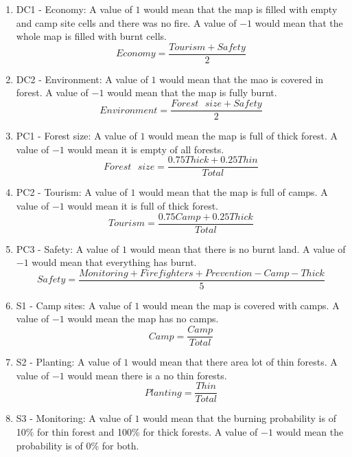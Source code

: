 \begin{enumerate}
\item DC1 - Economy: A value of $1$ would mean that the map is filled with empty and camp site cells and there was no fire. A value of $-1$ would mean that the whole map is filled with burnt cells.
	\begin{equation}
	Economy = \frac{Tourism + Safety}{2}
	\end{equation}
\item DC2 - Environment: A value of $1$ would mean that the mao is covered in forest. A value of $-1$ would mean that the map is fully burnt.
	\begin{equation}
	Environment = \frac{Forest \text{ } size + Safety}{2}
	\end{equation}
\item PC1 - Forest size: A value of $1$ would mean the map is full of thick forest. A value of $-1$ would mean it is empty of all forests.
	\begin{equation}
	Forest \text{ } size = \frac{0.75 Thick + 0.25 Thin}{Total}
	\end{equation}
\item PC2 - Tourism: A value of $1$ would mean that the map is full of camps. A value of $-1$ would mean it is full of thick forest.
	\begin{equation}
	Tourism = \frac{0.75 Camp + 0.25 Thick}{Total}
	\end{equation}
\item PC3 - Safety: A value of $1$ would mean that there is no burnt land. A value of $-1$ would mean that everything has burnt.
	\begin{equation}
	Safety = \frac{Monitoring + Firefighters + Prevention - Camp - Thick}{5}
	\end{equation}
\item S1 - Camp sites: A value of $1$ would mean the map is covered with camps. A value of $-1$ would mean the map has no camps.
	\begin{equation}
	Camp = \frac{Camp}{Total}
	\end{equation}
\item S2 - Planting: A value of $1$ would mean that there area lot of thin forests. A value of $-1$ would mean there is a no thin forests.
	\begin{equation}
	Planting = \frac{Thin}{Total}
	\end{equation}
\item S3 - Monitoring: A value of $1$ would mean that the burning probability is of 10\% for thin forest and 100\% for thick forests. A value of $-1$ would mean the probability is of 0\% for both.

\end{enumerate}
